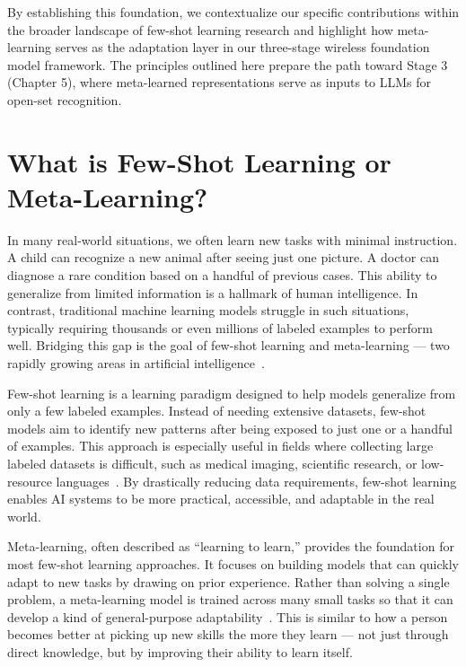 By establishing this foundation, we contextualize our specific contributions within the broader landscape of few-shot learning research and highlight how meta-learning serves as the adaptation layer in our three-stage wireless foundation model framework. The principles outlined here prepare the path toward Stage 3 (Chapter 5), where meta-learned representations serve as inputs to LLMs for open-set recognition.

\section{What is Few-Shot Learning or Meta-Learning?}

In many real-world situations, we often learn new tasks with minimal instruction. A child can recognize a new animal after seeing just one picture. A doctor can diagnose a rare condition based on a handful of previous cases. This ability to generalize from limited information is a hallmark of human intelligence. In contrast, traditional machine learning models struggle in such situations, typically requiring thousands or even millions of labeled examples to perform well. Bridging this gap is the goal of few-shot learning and meta-learning — two rapidly growing areas in artificial intelligence~\cite{lake2015human}.

Few-shot learning is a learning paradigm designed to help models generalize from only a few labeled examples. Instead of needing extensive datasets, few-shot models aim to identify new patterns after being exposed to just one or a handful of examples. This approach is especially useful in fields where collecting large labeled datasets is difficult, such as medical imaging, scientific research, or low-resource languages~\cite{wang2020generalizing}. By drastically reducing data requirements, few-shot learning enables AI systems to be more practical, accessible, and adaptable in the real world.

Meta-learning, often described as “learning to learn,” provides the foundation for most few-shot learning approaches. It focuses on building models that can quickly adapt to new tasks by drawing on prior experience. Rather than solving a single problem, a meta-learning model is trained across many small tasks so that it can develop a kind of general-purpose adaptability~\cite{finn2017model}. This is similar to how a person becomes better at picking up new skills the more they learn — not just through direct knowledge, but by improving their ability to learn itself.

